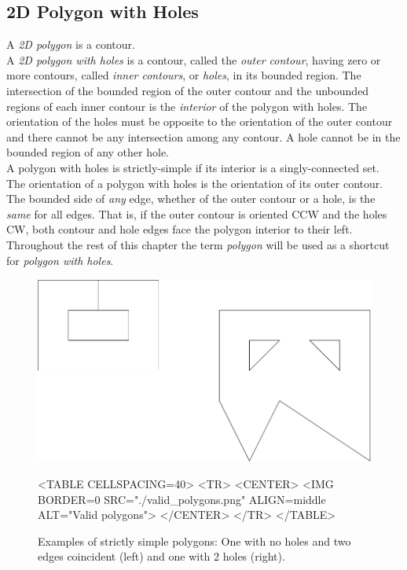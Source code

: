 \subsection{2D Polygon with Holes}

A {\em 2D polygon} is a contour.\\
A {\em 2D polygon with holes} is a contour, called the {\em outer contour}, having zero or more contours, called {\em inner contours}, or {\em holes}, in its bounded region. The intersection of the bounded region of the outer contour and the unbounded regions of each inner contour is the {\em interior} of the polygon with holes. The orientation of the holes must be opposite to the orientation of the outer contour and there cannot be any intersection among any contour. A hole cannot be in the bounded region of any other hole.\\
A polygon with holes is strictly-simple if its interior is a singly-connected set.\\
The orientation of a polygon with holes is the orientation of its outer contour. The bounded side of \textit{any} edge, whether of the outer contour or a hole, is the \textit{same} for all edges. That is, if the outer contour is oriented CCW and the holes CW, both contour and hole edges face the polygon interior to their left.\\

Throughout the rest of this chapter the term {\em polygon} will be used as a shortcut for {\em polygon with holes}. 

\begin{figure}[htbp]
\begin{ccTexOnly}
\begin{center}
\includegraphics{Straight_skeleton_2/valid_polygons} %
\end{center}
\end{ccTexOnly}
\begin{ccHtmlOnly}
<TABLE CELLSPACING=40>
<TR>
<CENTER>
<IMG BORDER=0 SRC="./valid_polygons.png" ALIGN=middle ALT="Valid polygons">
</CENTER>
</TR>
</TABLE>
\end{ccHtmlOnly}
\caption{Examples of strictly simple polygons: One with no holes and two edges coincident (left) and one with 2 holes (right).
\label{Valid-polygons}}
\end{figure}

